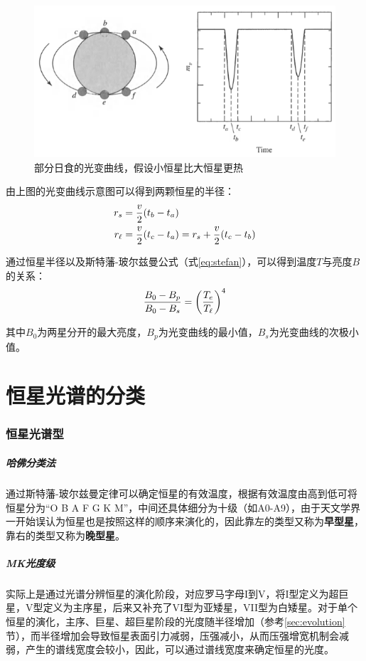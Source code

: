 \documentclass[openany]{ctexbook}
\begin{document}
\begin{figure}[hbt]
  \centering
  \includegraphics[width=12cm]{chapters/07/eclipse3}
  \caption{部分日食的光变曲线，假设小恒星比大恒星更热}
  \label{}
\end{figure}

由上图的光变曲线示意图可以得到两颗恒星的半径：
\begin{align}
  r_s&={v\over 2}(t_b-t_a)\\
  r_\ell &={v\over 2}(t_c-t_a)=r_s+{v\over 2}(t_c-t_b)
\end{align}

通过恒星半径以及斯特藩-玻尔兹曼公式（式\ref{eq:stefan}），可以得到温度$T$与亮度$B$的关系：
\begin{equation}
  {B_0-B_p\over B_0-B_s}=\left({T_e\over T_\ell}\right)^4
\end{equation}

其中$B_0$为两星分开的最大亮度，$B_p$为光变曲线的最小值，$B_s$为光变曲线的次极小值。

\chapter{恒星光谱的分类}
\subsection{恒星光谱型}
\paragraph{哈佛分类法}
通过斯特藩-玻尔兹曼定律可以确定恒星的有效温度，根据有效温度由高到低可将恒星分为``O B A F G K M''，中间还具体细分为十级（如A0-A9），由于天文学界一开始误认为恒星也是按照这样的顺序来演化的，因此靠左的类型又称为\textbf{早型星}，靠右的类型又称为\textbf{晚型星}。

\paragraph{MK光度级}
实际上是通过光谱分辨恒星的演化阶段，对应罗马字母I到V，将I型定义为超巨星，V型定义为主序星，后来又补充了VI型为亚矮星，VII型为白矮星。对于单个恒星的演化，主序、巨星、超巨星阶段的光度随半径增加（参考\ref{sec:evolution}节），而半径增加会导致恒星表面引力减弱，压强减小，从而压强增宽机制会减弱，产生的谱线宽度会较小，因此，可以通过谱线宽度来确定恒星的光度。\mbox{}\\
\end{document}
